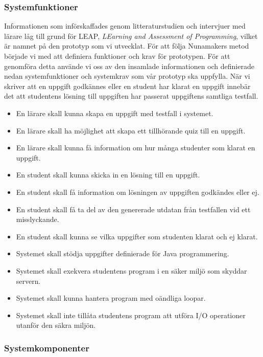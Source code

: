 \documentclass[a4paper,11pt]{article}
\begin{document}
{\subsubsection{Systemfunktioner} \label{systemfunktioner}
Informationen som införskaffades genom litteraturstudien och intervjuer med lärare låg till grund för LEAP, \textit{LEarning and Assessment of Programming}, vilket är namnet på den prototyp som vi utvecklat. För att följa Nunamakers metod började vi med att definiera funktioner och krav för prototypen. För att genomföra detta använde vi oss av den insamlade informationen och definierade nedan systemfunktioner och systemkrav som vår prototyp ska uppfylla. När vi skriver att en uppgift godkännes eller en student har klarat en uppgift innebär det att studentens lösning till uppgiften har passerat uppgiftens samtliga testfall.

\begin{itemize}
\item
En lärare skall kunna skapa en uppgift med testfall i systemet.
\item
En lärare skall ha möjlighet att skapa ett tillhörande quiz till en uppgift.
\item
En lärare skall kunna få information om hur många studenter som klarat en uppgift.
\item
En student skall kunna skicka in en lösning till en uppgift.
\item
En student skall få information om lösningen av uppgiften godkändes eller ej.
\item
En student skall få ta del av den genererade utdatan från testfallen vid ett misslyckande.
\item
En student skall kunna se vilka uppgifter som studenten klarat och ej klarat.
\item
Systemet skall stödja uppgifter definierade för Java programmering.
\item
Systemet skall exekvera studentens program i en säker miljö som skyddar servern.
\item
Systemet skall kunna hantera program med oändliga loopar.
\item
Systemet skall inte tillåta studentens program att utföra I/O operationer utanför den säkra miljön.
\end{itemize}

\subsubsection{Systemkomponenter} \label{systemkomponenter}

}
\end{document}

